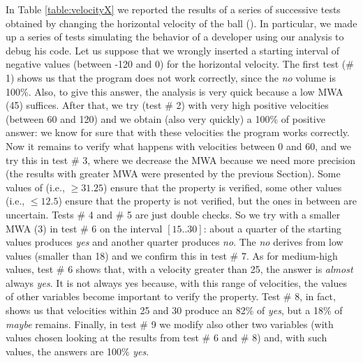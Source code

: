 In Table \ref{table:velocityX} we reported the results of a series of successive tests obtained by changing the horizontal velocity of the ball (). In particular, we made up a series of tests simulating the behavior of a developer using our analysis to debug his code. Let us suppose that we wrongly inserted a starting interval of negative values (between -120 and 0) for the horizontal velocity. The first test (\# 1) shows us that the program does not work correctly, since the \emph{no} volume is 100\%. Also, to give this answer, the analysis is very quick because a low MWA (45) suffices. After that, we try (test \# 2) with very high positive velocities (between 60 and 120) and we obtain (also very quickly) a 100\% of positive answer: we know for sure that with these velocities the program works correctly. Now it remains to verify what happens with velocities between 0 and 60, and we try this in test \# 3, where we decrease the MWA because we need more precision (the results with greater MWA were presented by the previous Section). Some values of  (i.e., $\geq 31.25$) ensure that the property is verified, some other values (i.e., $\leq 12.5$) ensure that the property is not verified, but the ones in between are uncertain. Tests \# 4 and \# 5 are just double checks.
So we try with a smaller MWA (3) in test \# 6 on the interval $[15..30]$: about a quarter of the starting values produces \emph{yes} and another quarter produces \emph{no}. The \emph{no} derives from low values (smaller than 18) and we confirm this in test \# 7. %
As for medium-high values, test \# 6 shows that, with a velocity greater than 25, the answer is \emph{almost} always \emph{yes}. It is not always yes because, with this range of velocities, the values of other variables become important to verify the property. Test \# 8, in fact, shows us that velocities within 25 and 30 produce an 82\% of \emph{yes}, but a 18\% of \emph{maybe} remains. Finally, in test \# 9 we modify also other two variables (with values chosen looking at the results from test \# 6 and \# 8)
and, with such values, the answers are 100\% \emph{yes}. 

